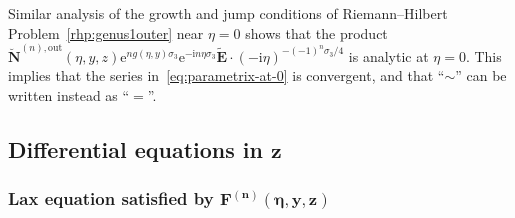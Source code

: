 \documentclass[11pt]{article}
\numberwithin{equation}{section}
\numberwithin{equation}{section}
\begin{document}
\begin{Remark}\label{rem:zero}
Similar analysis of the growth and jump conditions of Riemann--Hilbert Problem~\ref{rhp:genus1outer} near $\eta=0$ shows that the product $\breve{\mathbf{N}}^{(n),\mathrm{out}}(\eta,y,z)\mathrm{e}^{ng(\eta,y)\sigma_3}\mathrm{e}^{-\mathrm{i} n\eta\sigma_3}\widetilde{\mathbf{E}}\cdot(-\mathrm{i}\eta)^{-(-1)^n\sigma_3/4}$ is analytic at $\eta=0$. This implies that the series in~\eqref{eq:parametrix-at-0} is convergent, and that ``$\sim$'' can be written instead as ``$=$''.
\end{Remark}

\subsection[Differential equations in z]{Differential equations in $\boldsymbol{z}$}\label{sec:ODEz}

\subsubsection[Lax equation satisfied by F\^{}\{(n)\}(eta,y,z)]{Lax equation satisfied by $\boldsymbol{\mathbf{F}^{(n)}(\eta,y,z)}$}
\end{document}
